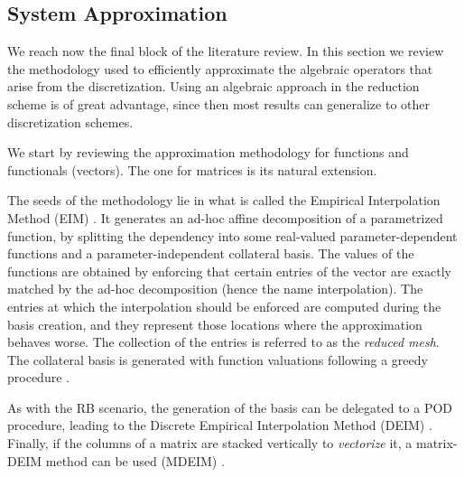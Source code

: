 \subsection{System Approximation}
We reach now the final block of the literature review.
In this section we review the methodology used to efficiently approximate 
the algebraic operators that arise from the discretization.
Using an algebraic approach in the reduction scheme is of great advantage,
since then most results can generalize to other discretization schemes.

We start by reviewing the approximation methodology for functions and functionals (vectors).
The one for matrices is its natural extension.

The seeds of the methodology lie in what is called the 
Empirical Interpolation Method (EIM)
\cite{barrault:hal-00021702,
Casenave2014,
Nguyen2008}.
It generates an ad-hoc affine decomposition of a parametrized function,
by splitting the dependency into some real-valued parameter-dependent functions 
and a parameter-independent collateral basis.
The values of the functions are obtained by 
enforcing that certain entries of the vector are 
exactly matched by the ad-hoc decomposition
(hence the name interpolation).
The entries at which the interpolation should be enforced 
are computed during the basis creation,
and they represent those locations where the approximation behaves worse.
The collection of the entries is referred to as the \textit{reduced mesh}.
The collateral basis is generated with function valuations following
a greedy procedure 
\cite{Hesthaven2014}.

As with the RB scenario, 
the generation of the basis can be delegated to a POD procedure,
leading to the Discrete Empirical Interpolation Method (DEIM)
\cite{2010_nonlinearModelReductionDeim_chaturantabut,
2018_podDeimReducedOrderModelDeformingMeshAeroelasticApplications_Donfrancesco}.
Finally, if the columns of a matrix are stacked vertically to \textit{vectorize} it,
a matrix-DEIM method can be used (MDEIM)
\cite{2012_deimAPosterioriNonlinear_DinamicalSystems,
2015_efficientModelReductionParametrizedSystemsMatrixDeim_Negri,
mdeim_elasticity_problems, 
Wirtz2014}.

